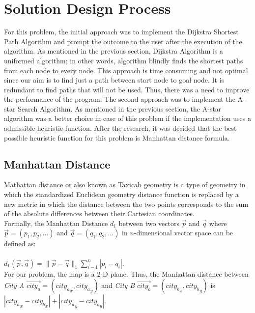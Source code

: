\documentclass{IEEEtran}
\begin{document}
\section{Solution Design Process\label{solution-design}}
For this problem, the initial approach was to implement the Dijkstra Shortest Path Algorithm and prompt the outcome to the user after the execution of the algorithm. As mentioned in the previous section, Dijkstra Algorithm is a uniformed algorithm; in other words, algorithm blindly finds the shortest paths from each node to every node. This approach is time consuming and not optimal since our aim is to find just a path between start node to goal node. It is redundant to find paths that will not be used. Thus, there was a need to improve the performance of the program. The second approach was to implement the A-star Search Algorithm. As mentioned in the previous section, the A-star algorithm was a better choice in case of this problem if the implementation uses a admissible heuristic function. After the research, it was decided that the best possible heuristic function for this problem is Manhattan distance formula.

\subsection{Manhattan Distance}
Mathattan distance or also known as Taxicab geometry is a type of geometry in which the standardized Euclidean geometry distance function is replaced by a new metric in which the distance between the two points corresponds to the sum of the absolute differences between their Cartesian coordinates. \cite{manhattan-distance}\\

Formally, the Manhattan Distance $d_1$ between two vectors $\vec{p}$ and  $\vec{q}$ where $\vec{p} = (p_1, p_2, ...)$ and $\vec{q} = (q_1, q_2, ...) $ in $n$-dimensional vector space can be defined as:\\ \\
$d_1(\vec{p}, \vec{q}) = \lVert \vec{p} - \vec{q} \rVert_1 \sum_{i-1}^{n} | p_i - q_i |$.\\

For our problem, the map is a 2-D plane. Thus, the Manhattan distance between \textit{City A} $\vec{city_a} = ({city_a}_x, {city_a}_y)$  and \textit{City B} $\vec{city_b} = ({city_b}_x, {city_b}_y)$ is $|{city_a}_x - {city_b}_x| + |{city_a}_y - {city_b}_y|$.
\end{document}
